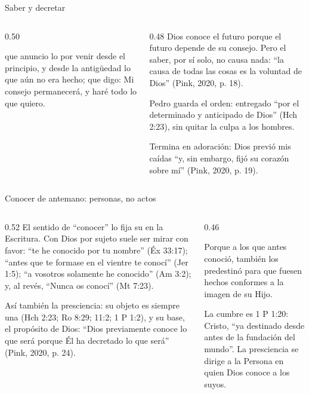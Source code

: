 \begin{frame}{Saber y decretar}
\begin{columns}[c,onlytextwidth]
\begin{column}{0.50\textwidth}
\begin{cita}[fontupper=\scriptsize\itshape]que anuncio lo por venir desde el principio, y desde la antigüedad lo que aún no era hecho; que digo: Mi consejo permanecerá, y haré todo lo que quiero.\end{cita}
\end{column}
\begin{column}{0.48\textwidth}\scriptsize
Dios conoce el futuro porque el futuro depende de su consejo. Pero el saber, por sí solo, no causa nada: ``la causa de todas las cosas es la voluntad de Dios'' (Pink, 2020, p. 18).\par\medskip
Pedro guarda el orden: entregado ``por el determinado  y anticipado  de Dios'' (Hch 2:23), sin quitar la culpa a los hombres.\par\medskip
Termina en adoración: Dios previó mis caídas ``y, sin embargo, fijó su corazón sobre mí'' (Pink, 2020, p. 19).
\end{column}
\end{columns}
\end{frame}

\begin{frame}{Conocer de antemano: personas, no actos}
\begin{columns}[t,onlytextwidth]
\begin{column}{0.52\textwidth}\scriptsize
El sentido de ``conocer'' lo fija su  en la Escritura. Con Dios por sujeto suele ser mirar con favor: ``te he conocido por tu nombre'' (Éx 33:17); ``antes que te formase en el vientre te conocí'' (Jer 1:5); ``a vosotros solamente he conocido'' (Am 3:2); y, al revés, ``Nunca os conocí'' (Mt 7:23).\par\medskip
Así también la presciencia: su objeto es siempre una  (Hch 2:23; Ro 8:29; 11:2; 1 P 1:2), y su base, el propósito de Dios: ``Dios previamente conoce lo que será porque Él ha decretado lo que será'' (Pink, 2020, p. 24).
\end{column}
\begin{column}{0.46\textwidth}
\begin{cita}[fontupper=\scriptsize\itshape]Porque a los que antes conoció, también los predestinó para que fuesen hechos conformes a la imagen de su Hijo.\end{cita}
\scriptsize La cumbre es 1 P 1:20: Cristo, ``ya destinado desde antes de la fundación del mundo''. La presciencia se dirige a la Persona en quien Dios conoce a los suyos.
\end{column}
\end{columns}
\end{frame}


